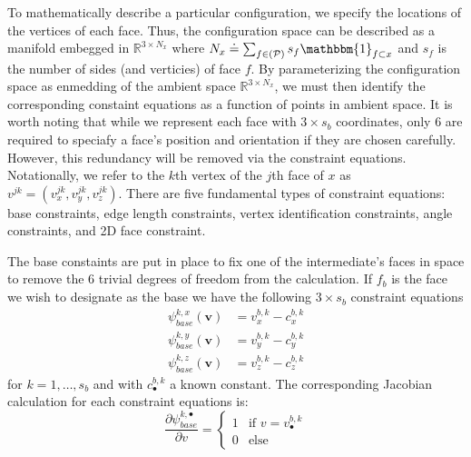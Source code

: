 To mathematically describe a particular configuration, we specify the locations of the vertices of each face. Thus, the configuration space can be described as a manifold embegged in $\mathbb{R}^{3\times N_x}$ where $N_x \doteq \sum_{f\in \left(\mathcal{P}\right)}s_f\mathbbm{1}_{f\subset x}$ and $s_f$ is the number of sides (and verticies) of face $f$. By parameterizing the configuration space as enmedding of the ambient space $\mathbb{R}^{3\times N_x}$, we must then identify the corresponding constaint equations as a function of points in ambient space. It is worth noting that while we represent each face with $3\times s_b$ coordinates, only 6 are required to speciafy a face's position and orientation if they are chosen carefully. However, this redundancy will be removed via the constraint equations. Notationally, we refer to the $k$th vertex of the $j$th face of $x$ as $v^{jk} = \left(v^{jk}_x,v^{jk}_y,v^{jk}_z\right)$. There are five fundamental types of constraint equations: base constraints, edge length constraints, vertex identification constraints, angle constraints, and 2D face constraint. 

The base constaints are put in place to fix one of the intermediate's faces in space to remove the 6 trivial degrees of freedom from the calculation. If $f_b$ is the face we wish to designate as the base we have the following $3\times s_b$ constraint equations
\begin{align}
\psi_{base}^{k,x}\left(\mathbf{v}\right)& = v^{b,k}_x - c^{b,k}_x \\
\psi_{base}^{k,y}\left(\mathbf{v}\right)& = v^{b,k}_y - c^{b,k}_y \\
\psi_{base}^{k,z}\left(\mathbf{v}\right)& = v^{b,k}_z - c^{b,k}_z
\end{align}  
for $k = 1,\dots,s_b$ and with $c^{b,k}_\bullet$ a known constant. The corresponding Jacobian calculation for each constraint equations is:
\[
\frac{\partial\psi_{base}^{k,\bullet}}{\partial v} =
  \begin{cases}
   1 & \text{if } v = v^{b,k}_\bullet \\
   0       & \text{else} 
  \end{cases}
\]

